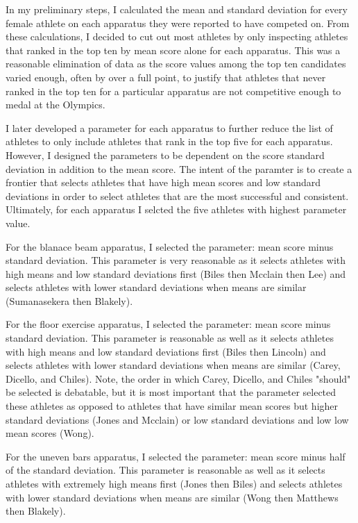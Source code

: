 \documentclass[12pt]{article}
\begin{document}
In my preliminary steps, I calculated the mean and standard deviation for every female athlete on each 
apparatus they were reported to have competed on. From these calculations, I decided to cut out most athletes 
by only inspecting athletes that ranked in the top ten by mean score alone for each apparatus. This was a 
reasonable elimination of data as the score values among the top ten candidates varied enough, often by over a 
full point, to justify that athletes that never ranked in the top ten for a particular apparatus are not 
competitive enough to medal at the Olympics.

I later developed a parameter for each apparatus to further reduce the list of athletes to only include athletes 
that rank in the top five for each apparatus. However, I designed the parameters to be dependent on the score 
standard deviation in addition to the mean score. The intent of the paramter is to create a frontier that selects 
athletes that have high mean scores and low standard deviations in order to select athletes that are the most 
successful and consistent. Ultimately, for each apparatus I selcted the five athletes with highest parameter value.

For the blanace beam apparatus, I selected the parameter: mean score minus standard deviation. This parameter 
is very reasonable as it selects athletes with high means and low standard deviations first (Biles then Mcclain 
then Lee) and selects athletes with lower standard deviations when means are similar (Sumanasekera then Blakely).

For the floor exercise apparatus, I selected the parameter: mean score minus standard deviation. This parameter 
is reasonable as well as it selects athletes with high means and low standard deviations first (Biles then Lincoln) 
and selects athletes with lower standard deviations when means are similar (Carey, Dicello, and Chiles). Note, the 
order in which Carey, Dicello, and Chiles "should" be selected is debatable, but it is most important that the 
parameter selected these athletes as opposed to athletes that have similar mean scores but higher standard deviations 
(Jones and Mcclain) or low standard deviations and low low mean scores (Wong).

For the uneven bars apparatus, I selected the parameter: mean score minus half of the standard deviation. 
This parameter is reasonable as well as it selects athletes with extremely high means first (Jones then Biles) and selects 
athletes with lower standard deviations when means are similar (Wong then Matthews then Blakely). 
\end{document}

